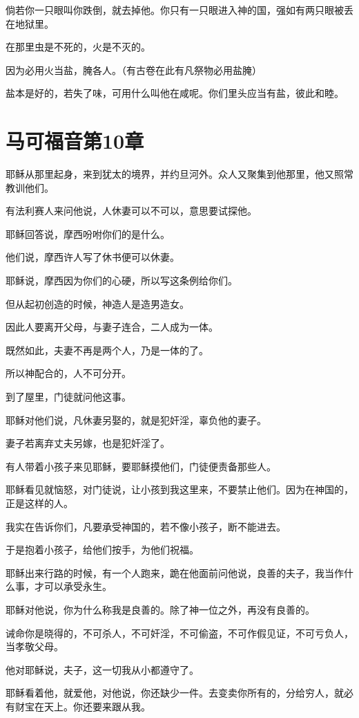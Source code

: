 \documentclass[12pt,oneside]{book}
\begin{document}
倘若你一只眼叫你跌倒，就去掉他。你只有一只眼进入神的国，强如有两只眼被丢在地狱里。

在那里虫是不死的，火是不灭的。

因为必用火当盐，腌各人。（有古卷在此有凡祭物必用盐腌）

盐本是好的，若失了味，可用什么叫他在咸呢。你们里头应当有盐，彼此和睦。

\chapter{马可福音第10章}
耶稣从那里起身，来到犹太的境界，并约旦河外。众人又聚集到他那里，他又照常教训他们。

有法利赛人来问他说，人休妻可以不可以，意思要试探他。

耶稣回答说，摩西吩咐你们的是什么。

他们说，摩西许人写了休书便可以休妻。

耶稣说，摩西因为你们的心硬，所以写这条例给你们。

但从起初创造的时候，神造人是造男造女。

因此人要离开父母，与妻子连合，二人成为一体。

既然如此，夫妻不再是两个人，乃是一体的了。

所以神配合的，人不可分开。

到了屋里，门徒就问他这事。

耶稣对他们说，凡休妻另娶的，就是犯奸淫，辜负他的妻子。

妻子若离弃丈夫另嫁，也是犯奸淫了。

有人带着小孩子来见耶稣，要耶稣摸他们，门徒便责备那些人。

耶稣看见就恼怒，对门徒说，让小孩到我这里来，不要禁止他们。因为在神国的，正是这样的人。

我实在告诉你们，凡要承受神国的，若不像小孩子，断不能进去。

于是抱着小孩子，给他们按手，为他们祝福。

耶稣出来行路的时候，有一个人跑来，跪在他面前问他说，良善的夫子，我当作什么事，才可以承受永生。

耶稣对他说，你为什么称我是良善的。除了神一位之外，再没有良善的。

诫命你是晓得的，不可杀人，不可奸淫，不可偷盗，不可作假见证，不可亏负人，当孝敬父母。

他对耶稣说，夫子，这一切我从小都遵守了。

耶稣看着他，就爱他，对他说，你还缺少一件。去变卖你所有的，分给穷人，就必有财宝在天上。你还要来跟从我。
\end{document}
